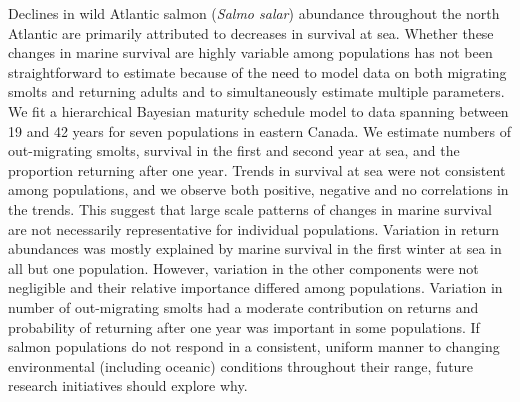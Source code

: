 \documentclass[12pt]{article}
\newcommand{\So}{$S_{1}$\xspace}
\newcommand{\St}{$S_{2}$\xspace}
\newcommand{\Pg}{$P_g$\xspace}
\begin{document}
Declines in wild Atlantic salmon (\emph{Salmo salar}) abundance throughout the north
Atlantic are primarily attributed to decreases in survival at sea. 
Whether these changes in marine survival are highly variable among populations
has not been straightforward to estimate because of
the need to model data on both migrating smolts and returning adults and to
simultaneously estimate multiple parameters. We fit a hierarchical Bayesian
maturity schedule model to data spanning between 19 and 42 years for seven populations in eastern 
Canada. We estimate numbers of out-migrating smolts, 
survival in the first and second year at sea, and the proportion returning after one year. 
Trends in survival at sea were not consistent among populations, and we observe both
positive, negative and no correlations in the trends. This suggest that large
scale patterns of changes in marine survival are not necessarily representative for
individual populations. 
Variation in return abundances was mostly explained by marine survival in the
first winter at sea in all but one population.
However, variation in the other components were not negligible and
their relative importance differed among populations. Variation in number of
out-migrating smolts had a moderate contribution on returns and probability of returning after one year was
important in some populations. 
If salmon populations do not respond in a consistent, uniform manner to
changing environmental (including oceanic) conditions throughout their range,
future research initiatives should explore why.
\end{document}

